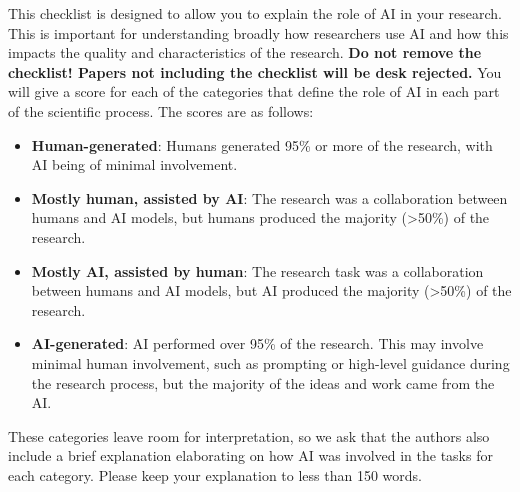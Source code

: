 \documentclass{article}
\begin{document}
This checklist is designed to allow you to explain the role of AI in your research. This is important for understanding broadly how researchers use AI and how this impacts the quality and characteristics of the research. \textbf{Do not remove the checklist! Papers not including the checklist will be desk rejected.} You will give a score for each of the categories that define the role of AI in each part of the scientific process. The scores are as follows:

\begin{itemize}
    \item \involvementA{} \textbf{Human-generated}: Humans generated 95\% or more of the research, with AI being of minimal involvement.
    \item \involvementB{} \textbf{Mostly human, assisted by AI}: The research was a collaboration between humans and AI models, but humans produced the majority (>50\%) of the research.
    \item \involvementC{} \textbf{Mostly AI, assisted by human}: The research task was a collaboration between humans and AI models, but AI produced the majority (>50\%) of the research.
    \item \involvementD{} \textbf{AI-generated}: AI performed over 95\% of the research. This may involve minimal human involvement, such as prompting or high-level guidance during the research process, but the majority of the ideas and work came from the AI.
\end{itemize}

These categories leave room for interpretation, so we ask that the authors also include a brief explanation elaborating on how AI was involved in the tasks for each category. Please keep your explanation to less than 150 words.
\end{document}
